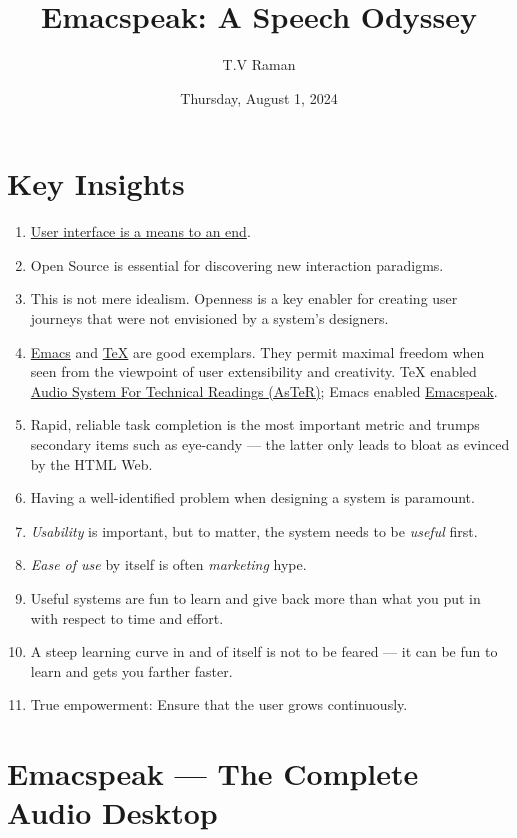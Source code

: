 \documentclass[11pt]{article}
\author{T.V Raman}
\date{Thursday, August 1, 2024}
\title{Emacspeak:  A Speech Odyssey}
\begin{document}
\maketitle
\tableofcontents

\section{Key Insights}
\label{sec:org81f327b}
\begin{enumerate}
\item \href{https://www.drdobbs.com:443/user-interface-a-means-to-an-end/184410453}{User interface is a means to an end}.
\item Open Source is essential  for discovering new interaction paradigms.
\item This is not mere idealism.  Openness is a key enabler for
creating   user journeys that were not  envisioned by a 
system's designers.
\item \href{https://www.gnu.org/s/emacs/}{Emacs} and  \href{https://en.wikipedia.org/wiki/TeX}{\TeX{}}    are good exemplars. They  permit maximal freedom
 when seen from the viewpoint of user extensibility and
creativity. \TeX{} enabled \href{https://emacspeak.blogspot.com/2022/12/aster-spoken-math-on-emacspeak-audio\_21.html}{Audio System For Technical Readings (AsTeR)}; Emacs enabled \href{https://emacspeak.sourceforge.net}{Emacspeak}.
\item Rapid, reliable task completion is the most important metric and
trumps secondary items such as eye-candy --- the latter only
leads to bloat as evinced by the HTML Web.
\item Having a well-identified  problem when designing a system
is paramount.
\item \emph{Usability} is important, but to   matter, the
system needs to be \emph{useful} first.
\item \emph{Ease of use} by   itself is often \emph{marketing} hype.
\item Useful systems are fun to learn and give back more than what you put
in with respect to time and effort.
\item A steep learning curve in and of itself is not to be feared --- it
can be fun to learn and  gets you farther faster.
\item True empowerment: Ensure that the user grows continuously.
\end{enumerate}
\section{Emacspeak --- The Complete Audio Desktop}
\label{sec:orge5e354a}
\end{document}
